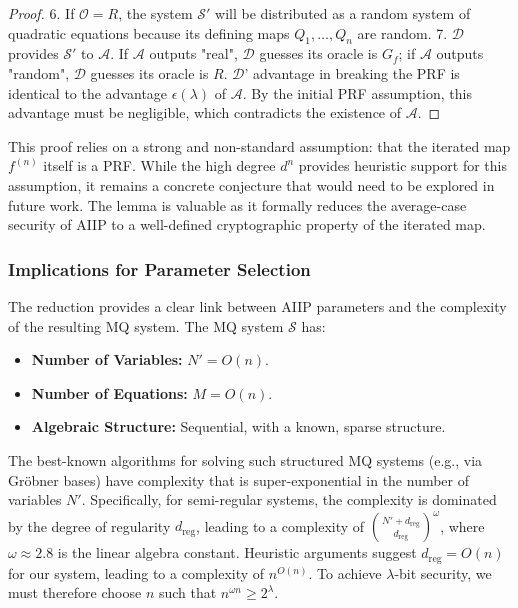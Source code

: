 \begin{proof}
                6.  If $\mathcal{O} = R$, the system $\mathcal{S}'$ will be distributed as a random system of quadratic equations because its defining maps $Q_1, \ldots, Q_n$ are random.
                7.  $\mathcal{D}$ provides $\mathcal{S}'$ to $\mathcal{A}$. If $\mathcal{A}$ outputs "real", $\mathcal{D}$ guesses its oracle is $G_f$; if $\mathcal{A}$ outputs "random", $\mathcal{D}$ guesses its oracle is $R$.
                $\mathcal{D}$' advantage in breaking the PRF is identical to the advantage $\epsilon(\lambda)$ of $\mathcal{A}$. By the initial PRF assumption, this advantage must be negligible, which contradicts the existence of $\mathcal{A}$.
            \end{proof}
            \begin{remark}
                This proof relies on a strong and non-standard assumption: that the iterated map $f^{(n)}$ itself is a PRF. While the high degree $d^n$ provides heuristic support for this assumption, it remains a concrete conjecture that would need to be explored in future work. The lemma is valuable as it formally reduces the average-case security of AIIP to a well-defined cryptographic property of the iterated map.
            \end{remark}
            \subsubsection{Implications for Parameter Selection}
                The reduction provides a clear link between AIIP parameters and the complexity of the resulting MQ system. The MQ system $\mathcal{S}$ has:
                \begin{itemize}
                    \item \textbf{Number of Variables:} $N' = O(n)$.
                    \item \textbf{Number of Equations:} $M = O(n)$.
                    \item \textbf{Algebraic Structure:} Sequential, with a known, sparse structure.
                \end{itemize}
                The best-known algorithms for solving such structured MQ systems (e.g., via Gröbner bases) have complexity that is super-exponential in the number of variables $N'$. Specifically, for semi-regular systems, the complexity is dominated by the degree of regularity $d_{\text{reg}}$, leading to a complexity of $\binom{N' + d_{\text{reg}}}{d_{\text{reg}}}^{\omega}$, where $\omega \approx 2.8$ is the linear algebra constant. Heuristic arguments suggest $d_{\text{reg}} = O(n)$ for our system, leading to a complexity of $n^{O(n)}$. To achieve $\lambda$-bit security, we must therefore choose $n$ such that $n^{\omega n} \geq 2^{\lambda}$.
